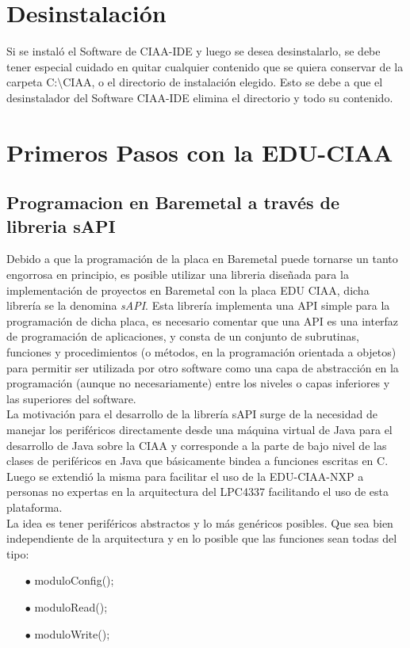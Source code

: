 \documentclass[12pt,letterpaper]{article}
\begin{document}
\section{Desinstalación}
Si se instaló el Software de CIAA-IDE y luego se desea desinstalarlo, se debe tener especial
cuidado en quitar cualquier contenido que se quiera conservar de la carpeta C:$\setminus$CIAA, o el directorio de instalación elegido. Esto se debe a que el desinstalador del Software CIAA-IDE elimina el directorio y todo su contenido.

\section{Primeros Pasos con la EDU-CIAA}

\subsection{Programacion en Baremetal a través de libreria sAPI}\label{sec:programacionbaremetal}
Debido a que la programación de la placa en Baremetal puede tornarse un tanto engorrosa en principio, es posible utilizar una libreria diseñada para la implementación de proyectos en Baremetal con la placa EDU CIAA, dicha librería se la denomina \textit{sAPI}. Esta librería implementa una API simple para la programación de dicha placa, es necesario comentar que una API es una interfaz de programación de aplicaciones, y consta de un conjunto de subrutinas, funciones y procedimientos (o métodos, en la programación orientada a objetos) para permitir ser utilizada por otro software como una capa de abstracción en la programación (aunque no necesariamente) entre los niveles o capas inferiores y las superiores del software\cite{sapi}.
 \\
 
La motivación para el desarrollo de la librería sAPI surge de la necesidad de manejar los periféricos directamente desde una máquina virtual de Java para el desarrollo de Java sobre la CIAA y corresponde a la parte de bajo nivel de las clases de periféricos en Java que básicamente bindea a funciones escritas en C.
Luego se extendió la misma para facilitar el uso de la EDU-CIAA-NXP a personas no expertas en la arquitectura del LPC4337 facilitando el uso de esta plataforma.
 \\
 
La idea es tener periféricos abstractos y lo más genéricos posibles. Que sea bien independiente de la arquitectura y en lo posible que las funciones sean todas del tipo:
\begin{enumerate}
\item[$\bullet$]	moduloConfig();
\item[$\bullet$]  moduloRead();
\item[$\bullet$]  moduloWrite();
\end{enumerate}
\end{document}
